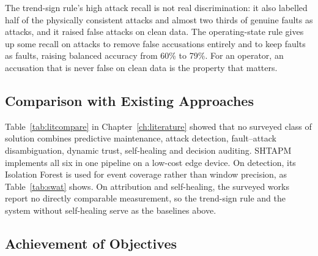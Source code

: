 The trend-sign rule's high attack recall is not real discrimination: it also labelled half of the physically consistent attacks and almost two thirds of genuine faults as attacks, and it raised false attacks on clean data. The operating-state rule gives up some recall on attacks to remove false accusations entirely and to keep faults as faults, raising balanced accuracy from 60\% to 79\%. For an operator, an accusation that is never false on clean data is the property that matters.

\subsection{Comparison with Existing Approaches}

Table~\ref{tab:litcompare} in Chapter~\ref{ch:literature} showed that no surveyed class of solution combines predictive maintenance, attack detection, fault--attack disambiguation, dynamic trust, self-healing and decision auditing. SHTAPM implements all six in one pipeline on a low-cost edge device. On detection, its Isolation Forest is used for event coverage rather than window precision, as Table~\ref{tab:swat} shows. On attribution and self-healing, the surveyed works report no directly comparable measurement, so the trend-sign rule and the system without self-healing serve as the baselines above.

\subsection{Achievement of Objectives}

